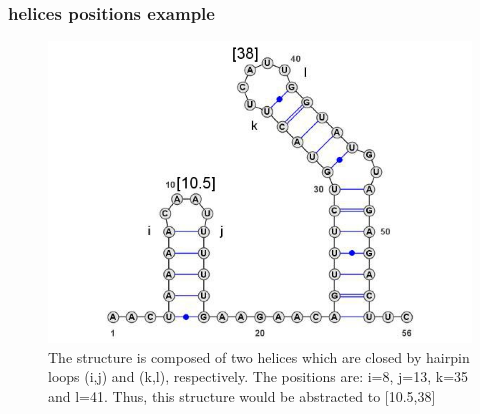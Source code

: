\documentclass[ignorenonframetext,10pt]{beamer}
\begin{document}
\begin{frame}
\frametitle{helices positions example}  
\begin{figure}
  \includegraphics[scale=0.5]{images/helices_position.jpg} 
  \caption{The structure is composed of two helices which are closed by hairpin
  loops (i,j) and (k,l), respectively. The positions are: i=8, j=13, k=35 and
  l=41. Thus, this structure would be abstracted to [10.5,38]}
\end{figure}
\end{frame}
\end{document}
